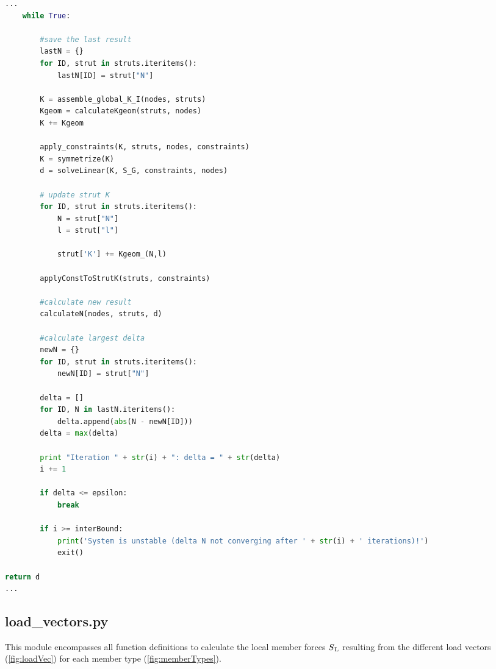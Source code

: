 \begin{inconsolata}
\begin{minipage}{\linewidth}
\begin{lstlisting}[language=python]
...
    while True:

        #save the last result
        lastN = {}
        for ID, strut in struts.iteritems():
            lastN[ID] = strut["N"]

        K = assemble_global_K_I(nodes, struts)
        Kgeom = calculateKgeom(struts, nodes)
        K += Kgeom

        apply_constraints(K, struts, nodes, constraints)
        K = symmetrize(K)
        d = solveLinear(K, S_G, constraints, nodes)

        # update strut K
        for ID, strut in struts.iteritems():
            N = strut["N"]
            l = strut["l"]

            strut['K'] += Kgeom_(N,l)

        applyConstToStrutK(struts, constraints)

        #calculate new result
        calculateN(nodes, struts, d)

        #calculate largest delta
        newN = {}
        for ID, strut in struts.iteritems():
            newN[ID] = strut["N"]

        delta = []
        for ID, N in lastN.iteritems():
            delta.append(abs(N - newN[ID]))
        delta = max(delta)

        print "Iteration " + str(i) + ": delta = " + str(delta)
        i += 1

        if delta <= epsilon:
            break

        if i >= interBound:
            print('System is unstable (delta N not converging after ' + str(i) + ' iterations)!')
            exit()

return d
...
\end{lstlisting}
\end{minipage}
\end{inconsolata}

\pagebreak

\subsection{load\_vectors.py}
\label{subsec:loadvectors.py}

This module encompasses all function definitions to calculate the local member forces $S\textsubscript{L}$ \cite[4.2-4.11]{schneider} resulting from the different load vectors (\cref{fig:loadVec}) for each member type (\cref{fig:memberTypes}).


